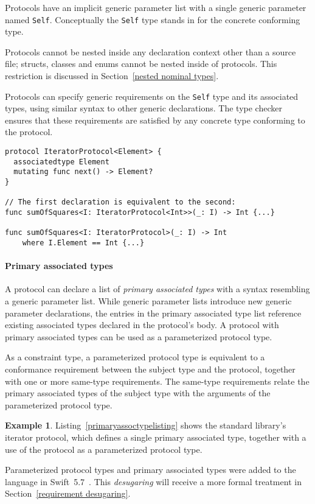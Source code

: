 \documentclass[a4paper,headsepline,bibliography=totoc,toc=flat,fleqn,twoside=semi]{scrbook}
\theoremstyle{definition}
\theoremstyle{definition}
\newtheorem{example}{Example}[chapter]
\theoremstyle{definition}
\begin{document}
Protocols have an implicit generic parameter list with a single generic parameter named \texttt{Self}. Conceptually the \texttt{Self} type stands in for the concrete conforming type.

Protocols cannot be nested inside any declaration context other than a source file; structs, classes and enums cannot be nested inside of protocols. This restriction is discussed in Section~\ref{nested nominal types}.

Protocols can specify generic requirements on the \texttt{Self} type and its associated types, using similar syntax to other generic declarations. The type checker ensures that these requirements are satisfied by any concrete type conforming to the protocol.
\begin{listing}\label{primaryassoctypelisting}
\begin{Verbatim}
protocol IteratorProtocol<Element> {
  associatedtype Element
  mutating func next() -> Element?
}

// The first declaration is equivalent to the second:
func sumOfSquares<I: IteratorProtocol<Int>>(_: I) -> Int {...}

func sumOfSquares<I: IteratorProtocol>(_: I) -> Int
    where I.Element == Int {...}
\end{Verbatim}
\end{listing}

\paragraph{Primary associated types}
A protocol can declare a list of \emph{primary associated types} with a syntax resembling a generic parameter list. While generic parameter lists introduce new generic parameter declarations, the entries in the primary associated type list reference existing associated types declared in the protocol's body. A protocol with primary associated types can be used as a parameterized protocol type.

As a constraint type, a parameterized protocol type is equivalent to a conformance requirement between the subject type and the protocol, together with one or more same-type requirements. The same-type requirements relate the primary associated types of the subject type with the arguments of the parameterized protocol type.
\begin{example}
Listing~\ref{primaryassoctypelisting} shows the standard library's iterator protocol, which defines a single primary associated type, together with a use of the protocol as a parameterized protocol type.
\end{example}
Parameterized protocol types and primary associated types were added to the language in Swift~5.7~\cite{se0346}. This \emph{desugaring} will receive a more formal treatment in Section~\ref{requirement desugaring}.
\end{document}
